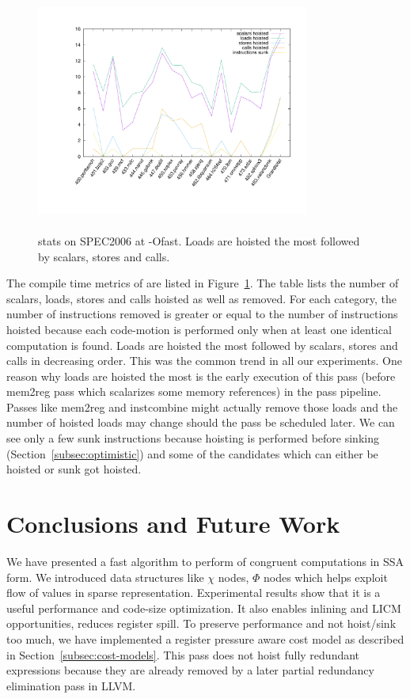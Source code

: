 \documentclass[sigplan,10pt,review,anonymous]{acmart}\settopmatter{printfolios=true,printccs=false,printacmref=false}
\begin{document}
\begin{figure}[h!]
  \includegraphics[width=0.8\textwidth,height=8cm]{gcm-stats.pdf}
  \vspace*{-1.5cm}
\caption{\GCM{} stats on SPEC2006 at -Ofast. Loads are hoisted the most followed
  by scalars, stores and calls.}
\label{tab:code-motion-metric}
\end{figure}

The compile time metrics of \GCM{} are listed in
Figure~\ref{tab:code-motion-metric}. The table lists the number of scalars,
loads, stores and calls hoisted as well as removed. For each category, the
number of instructions removed is greater or equal to the number of instructions
hoisted because each code-motion is performed only when at least one identical
computation is found. Loads are hoisted the most followed by scalars, stores and
calls in decreasing order.  This was the common trend in all our
experiments. One reason why loads are hoisted the most is the early execution of
this pass (before mem2reg pass which scalarizes some memory references) in the
\LLVM{} pass pipeline. Passes like mem2reg and instcombine might actually remove
those loads and the number of hoisted loads may change should the \GCM{} pass be
scheduled later. We can see only a few sunk instructions because hoisting is
performed before sinking (Section~\ref{subsec:optimistic}) and some of the
candidates which can either be hoisted or sunk got hoisted.

\section{Conclusions and Future Work}
\label{sec:future-work}
We have presented a fast algorithm to perform \gcm{} of congruent computations
in SSA form. We introduced data structures like $\chi$ nodes, $\Phi$ nodes which
helps exploit flow of values in sparse representation.  Experimental results
show that it is a useful performance and code-size optimization. It also enables
inlining and LICM opportunities, reduces register spill. To preserve performance
and not hoist/sink too much, we have implemented a register pressure aware cost
model as described in Section~\ref{subsec:cost-models}. This pass does not hoist
fully redundant expressions because they are already removed by a later partial
redundancy elimination pass in LLVM.
\end{document}
